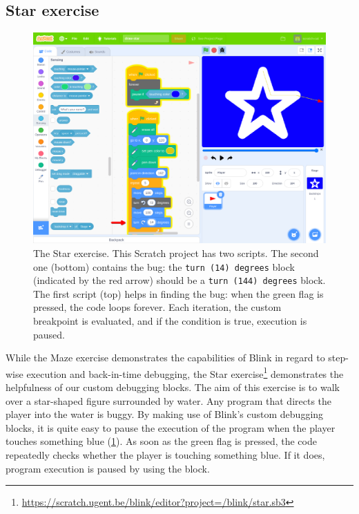\documentclass[../main]{subfiles}
\begin{document}
\subsection{Star exercise}\label{subsec:star-exercise}

\begin{figure}
    \begin{wide}
        \includegraphics[width=\linewidth]{draw-star}
    \end{wide}
    \caption{
        The Star exercise.
        This Scratch project has two scripts.
        The second one (bottom) contains the bug: the \texttt{turn (14) degrees} block (indicated by the red arrow) should be a \texttt{turn (144) degrees} block.
        The first script (top) helps in finding the bug: when the green flag is pressed, the code loops forever.
        Each iteration, the custom breakpoint is evaluated, and if the condition is true, execution is paused.
    }
    \label{fig:star-exercise}
\end{figure}

While the Maze exercise demonstrates the capabilities of Blink in regard to step-wise execution and back-in-time debugging, the Star exercise\footnote{\url{https://scratch.ugent.be/blink/editor?project=/blink/star.sb3}} demonstrates the helpfulness of our custom debugging blocks.
The aim of this exercise is to walk over a star-shaped figure surrounded by water.
Any program that directs the player into the water is buggy.
By making use of Blink's custom debugging blocks, it is quite easy to pause the execution of the program when the player touches something blue (\cref{fig:star-exercise}).
As soon as the green flag is pressed, the code repeatedly checks whether the player is touching something blue.
If it does, program execution is paused by using the  block.
\end{document}
